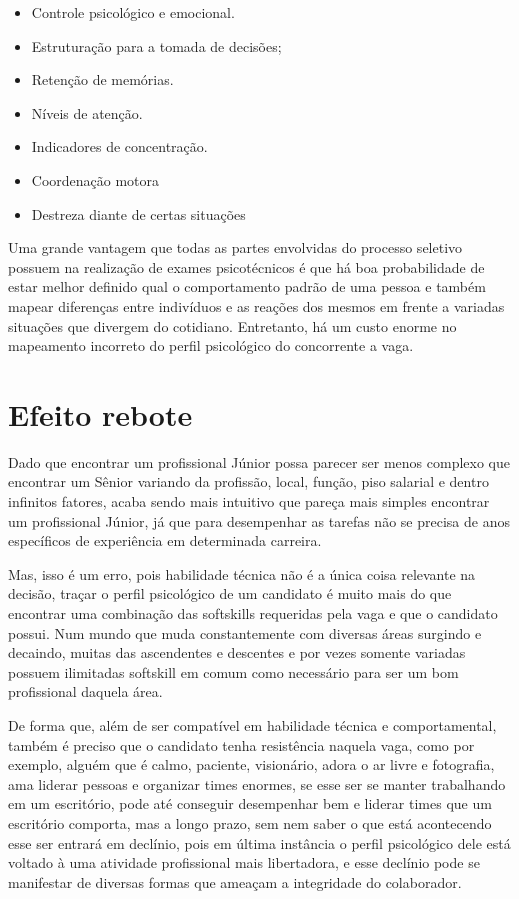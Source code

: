 \documentclass[12pt]{article}
\begin{document}
\begin{itemize}
	\item Controle psicológico e emocional.
	\item Estruturação para a tomada de decisões;
	\item Retenção de memórias.
	\item Níveis de atenção.
	\item Indicadores de concentração.
	\item Coordenação motora
	\item Destreza diante de certas situações
\end{itemize}

Uma grande vantagem que todas as partes envolvidas do processo seletivo possuem na realização de exames psicotécnicos é que há boa probabilidade de estar melhor definido qual o comportamento padrão de uma pessoa e também mapear diferenças entre indivíduos e as reações dos mesmos em frente a variadas situações que divergem do cotidiano. Entretanto, há um custo enorme no mapeamento incorreto do perfil psicológico do concorrente a vaga.

\section{Efeito rebote}

Dado que encontrar um profissional Júnior possa parecer ser menos complexo que encontrar um Sênior variando da profissão, local, função, piso salarial e dentro infinitos fatores, acaba sendo mais intuitivo que pareça mais simples encontrar um profissional Júnior, já que para desempenhar as tarefas não se precisa de anos específicos de experiência em determinada carreira.

Mas, isso é um erro, pois habilidade técnica não é a única coisa relevante na decisão, traçar o perfil psicológico de um candidato é muito mais do que encontrar uma combinação das softskills requeridas pela vaga e que o candidato possui. Num mundo que muda constantemente com diversas áreas surgindo e decaindo, muitas das ascendentes e descentes e por vezes somente variadas possuem ilimitadas softskill em comum como necessário para ser um bom profissional daquela área.

De forma que, além de ser compatível em habilidade técnica e comportamental, também é preciso que o candidato tenha resistência naquela vaga, como por exemplo, alguém que é calmo, paciente, visionário, adora o ar livre e fotografia, ama liderar pessoas e organizar times enormes, se esse ser se manter trabalhando em um escritório, pode até conseguir desempenhar bem e liderar times que um escritório comporta, mas a longo prazo, sem nem saber o que está acontecendo esse ser entrará em declínio, pois em última instância o perfil psicológico dele está voltado à uma atividade profissional mais libertadora, e esse declínio pode se manifestar de diversas formas que ameaçam a integridade do colaborador.
\end{document}
